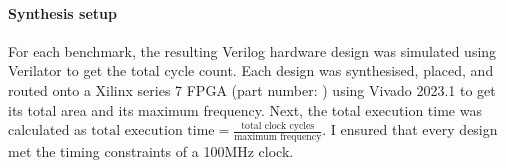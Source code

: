 \paragraph{Synthesis setup} For each benchmark, the resulting Verilog hardware
design was simulated using Verilator to get the total cycle count.  Each design
was synthesised, placed, and routed onto a Xilinx series 7 FPGA (part number:
) using Vivado 2023.1 to get its total area and its
maximum frequency.  Next, the total execution time was calculated as
$\text{total execution time} = \frac{\text{total clock cycles}}{\text{maximum
    frequency}}$.  I ensured that every design met the timing constraints of a
100MHz clock.



\newcommand\BambuDefault{%
\setul{-1pt}{3pt}\setulcolor{colorBambuDefaultLIGHT}%
{\ul{\textsf{Bambu-default}}}}

\newcommand\BambuNoOpt{%
\setul{-1pt}{3pt}\setulcolor{colorBambuNoOptLIGHT}%
{\ul{\textsf{Bambu-no-opt}}}}

\newcommand\VericertBase{%
\setul{-1pt}{3pt}\setulcolor{colorVericertBaseLIGHT}%
{\ul{\textsf{Vericert-original}}}}

\newcommand\VericertList{%
\setul{-1pt}{3pt}\setulcolor{colorVericertListLIGHT}%
{\ul{\textsf{Vericert-list-scheduling}}}}

\newcommand\VericertHyper{%
\setul{-1pt}{3pt}\setulcolor{colorVericertHyperLIGHT}%
{\ul{\textsf{Vericert-hyperblock-scheduling}}}}



